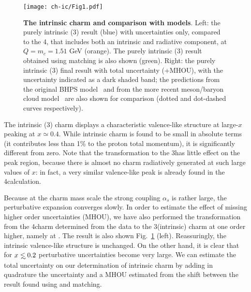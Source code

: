 \begin{figure}[h]
  \begin{center}
    \texttt{[image: ch-ic/Fig1.pdf]}
    \caption{\small  \textbf{ The intrinsic charm \pdf
      and comparison with models}.
%
      Left: the purely
      intrinsic (3\fns) result (blue)
      with \pdf uncertainties only, compared to the 4\fns \pdf, that
      includes both an intrinsic and radiative
      component,   at
      $Q=m_c=1.51$ GeV (orange). The purely intrinsic (3\fns)
      result obtained using \nnnlo matching is also shown (green).
      Right: the purely
      intrinsic (3\fns)
      final result with total uncertainty (\pdf+MHOU), with the \pdf
      uncertainty indicated as a dark shaded band;
the predictions from the original 
BHPS model~\cite{Brodsky:1980pb} and from the more recent meson/baryon
      cloud model~\cite{Hobbs:2013bia} are also shown for comparison
      (dotted and dot-dashed curves respectively).
         \label{fig:ic/charm_content_3fns} }
\end{center}
\end{figure}

The intrinsic (3\fns) charm \pdf
displays a characteristic valence-like
 structure at large-$x$ peaking at $x\simeq 0.4$.
%
 While intrinsic charm is found to be small in absolute terms
 (it contributes less than 1\% to the proton  total momentum),
 it is significantly different from zero.
%
 Note that the transformation to the 3\fns has little effect on the peak region,
 because there is almost no charm radiatively generated at such large values of $x$: in
 fact, a very similar valence-like peak is already found in the 4\fns calculation.

Because at the charm mass scale the strong coupling $\alpha_s$ is rather
large, the perturbative expansion converges slowly.
%
In order to
estimate the effect of missing higher order uncertainties (MHOU), we
have also performed the transformation from the 4\fns \nnlo charm \pdf
determined from the data to the 3\fns (intrinsic) charm \pdf at one
order higher, namely at \nnnlo. 
%
The result is also shown
Fig.~\ref{fig:ic/charm_content_3fns} (left). Reassuringly, the intrinsic
valence-like structure is unchanged.
%
On the other hand, it is clear that for
$x\lsim 0.2$ perturbative uncertainties become very large.
%
We can estimate  the total uncertainty on our determination
of intrinsic charm by adding in quadrature the \pdf uncertainty and a
MHOU estimated from the shift between the result found using \nnlo
and \nnnlo matching.

